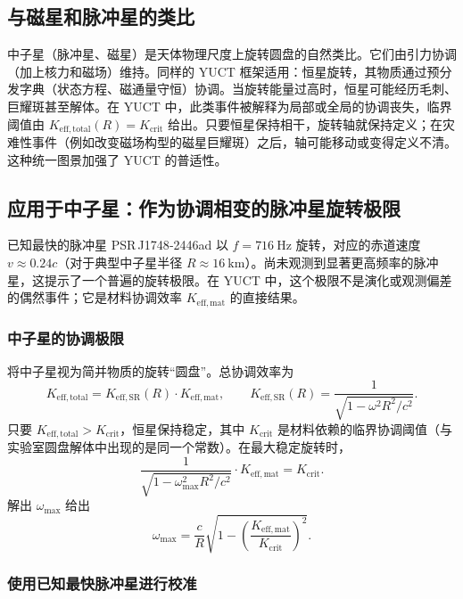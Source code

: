 \documentclass[12pt,a4paper]{article}
\newcommand{\Kefftot}{K_{\mathrm{eff,total}}}
\newcommand{\Kcrit}{K_{\mathrm{crit}}}
\begin{document}
	\subsection{与磁星和脉冲星的类比}
	
	中子星（脉冲星、磁星）是天体物理尺度上旋转圆盘的自然类比。它们由引力协调（加上核力和磁场）维持。同样的 YUCT 框架适用：恒星旋转，其物质通过预分发字典（状态方程、磁通量守恒）协调。当旋转能量过高时，恒星可能经历毛刺、巨耀斑甚至解体。在 YUCT 中，此类事件被解释为局部或全局的协调丧失，临界阈值由 \(\Kefftot(R) = \Kcrit\) 给出。只要恒星保持相干，旋转轴就保持定义；在灾难性事件（例如改变磁场构型的磁星巨耀斑）之后，轴可能移动或变得定义不清。这种统一图景加强了 YUCT 的普适性。
	
	\subsection{应用于中子星：作为协调相变的脉冲星旋转极限}
	
	已知最快的脉冲星 PSR J1748‑2446ad 以 \(f = 716\ \text{Hz}\) 旋转，对应的赤道速度 \(v \approx 0.24c\)（对于典型中子星半径 \(R\approx 16\ \text{km}\)）。尚未观测到显著更高频率的脉冲星，这提示了一个普遍的旋转极限。在 YUCT 中，这个极限不是演化或观测偏差的偶然事件；它是材料协调效率 \(K_{\mathrm{eff,mat}}\) 的直接结果。
	
	\subsubsection{中子星的协调极限}
	
	将中子星视为简并物质的旋转“圆盘”。总协调效率为
	\[
	K_{\mathrm{eff,total}} = K_{\mathrm{eff,SR}}(R) \cdot K_{\mathrm{eff,mat}},
	\qquad
	K_{\mathrm{eff,SR}}(R) = \frac{1}{\sqrt{1 - \omega^2 R^2/c^2}}.
	\]
	只要 \(K_{\mathrm{eff,total}} > K_{\mathrm{crit}}\)，恒星保持稳定，其中 \(K_{\mathrm{crit}}\) 是材料依赖的临界协调阈值（与实验室圆盘解体中出现的是同一个常数）。在最大稳定旋转时，
	\[
	\frac{1}{\sqrt{1 - \omega_{\max}^2 R^2/c^2}} \cdot K_{\mathrm{eff,mat}} = K_{\mathrm{crit}}.
	\]
	解出 \(\omega_{\max}\) 给出
	\[
	\omega_{\max} = \frac{c}{R}\sqrt{1 - \left(\frac{K_{\mathrm{eff,mat}}}{K_{\mathrm{crit}}}\right)^2}.
	\]
	
	\subsubsection{使用已知最快脉冲星进行校准}
	
\end{document}
